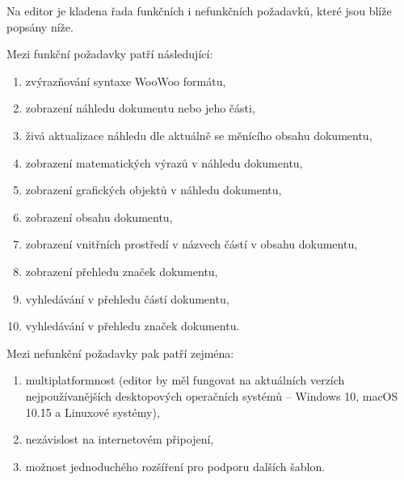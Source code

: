 Na editor je kladena řada funkčních i nefunkčních požadavků, které jsou blíže popsány níže.

Mezi funkční požadavky patří následující:

\begin{enumerate}[label=\textbf{F\arabic*}, ref=F\arabic*]
    \item zvýrazňování syntaxe WooWoo formátu,
    \item zobrazení náhledu dokumentu nebo jeho části,
    \item živá aktualizace náhledu dle aktuálně se měnícího obsahu dokumentu,
    \item zobrazení matematických výrazů v náhledu dokumentu,
    \item zobrazení grafických objektů v náhledu dokumentu,
    \item zobrazení obsahu dokumentu,
    \item zobrazení vnitřních prostředí v názvech částí v obsahu dokumentu,
    \item zobrazení přehledu značek dokumentu,
    \item vyhledávání v přehledu částí dokumentu,
    \item vyhledávání v přehledu značek dokumentu.
\end{enumerate}

Mezi nefunkční požadavky pak patří zejména:

\begin{enumerate}[label=\textbf{N\arabic*}, ref=N\arabic*]
    \item multiplatformnost (editor by měl fungovat na aktuálních verzích nejpoužívanějších desktopových operačních
        systémů – Windows 10, macOS 10.15 a Linuxové systémy),
    \item nezávislost na internetovém připojení,
    \item možnost jednoduchého rozšíření pro podporu dalších šablon.
\end{enumerate}

